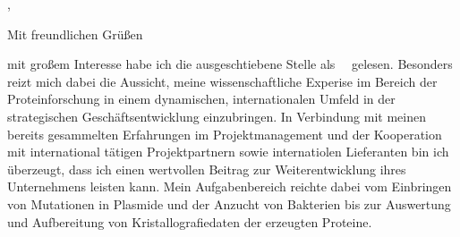 



\recipient{\firma{}}{\adresse{}}
\opening{\anrede{},}
\date{\today}
\closing{Mit freundlichen Grüßen}
{}
\makelettertitle
\justifying



mit großem Interesse habe ich die ausgeschtiebene Stelle als  \stelleText~\firmaText~gelesen. Besonders reizt mich dabei die Aussicht, meine wissenschaftliche Experise im Bereich der Proteinforschung  in einem dynamischen, internationalen Umfeld in der strategischen Geschäftsentwicklung einzubringen. In Verbindung mit meinen bereits gesammelten Erfahrungen im Projektmanagement und der Kooperation mit international tätigen Projektpartnern sowie internatiolen Lieferanten bin ich überzeugt, dass ich einen wertvollen Beitrag zur Weiterentwicklung ihres Unternehmens leisten kann. 
Mein Aufgabenbereich reichte dabei vom Einbringen von Mutationen in Plasmide und der Anzucht von Bakterien bis zur Auswertung und Aufbereitung von Kristallografiedaten der erzeugten Proteine. 
